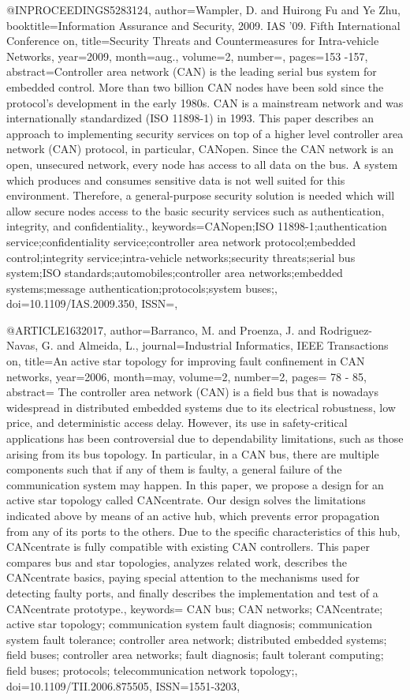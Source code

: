 @INPROCEEDINGS{5283124, 
author={Wampler, D. and Huirong Fu and Ye Zhu}, 
booktitle={Information Assurance and Security, 2009. IAS '09. Fifth International Conference on}, title={Security Threats and Countermeasures for Intra-vehicle Networks}, 
year={2009}, 
month={aug.}, 
volume={2}, 
number={}, 
pages={153 -157}, 
abstract={Controller area network (CAN) is the leading serial bus system for embedded control. More than two billion CAN nodes have been sold since the protocol's development in the early 1980s. CAN is a mainstream network and was internationally standardized (ISO 11898-1) in 1993. This paper describes an approach to implementing security services on top of a higher level controller area network (CAN) protocol, in particular, CANopen. Since the CAN network is an open, unsecured network, every node has access to all data on the bus. A system which produces and consumes sensitive data is not well suited for this environment. Therefore, a general-purpose security solution is needed which will allow secure nodes access to the basic security services such as authentication, integrity, and confidentiality.}, 
keywords={CANopen;ISO 11898-1;authentication service;confidentiality service;controller area network protocol;embedded control;integrity service;intra-vehicle networks;security threats;serial bus system;ISO standards;automobiles;controller area networks;embedded systems;message authentication;protocols;system buses;}, 
doi={10.1109/IAS.2009.350}, 
ISSN={},}

@ARTICLE{1632017, 
author={Barranco, M. and Proenza, J. and Rodriguez-Navas, G. and Almeida, L.}, 
journal={Industrial Informatics, IEEE Transactions on}, title={An active star topology for improving fault confinement in CAN networks}, 
year={2006}, 
month={may}, 
volume={2}, 
number={2}, 
pages={ 78 - 85}, 
abstract={ The controller area network (CAN) is a field bus that is nowadays widespread in distributed embedded systems due to its electrical robustness, low price, and deterministic access delay. However, its use in safety-critical applications has been controversial due to dependability limitations, such as those arising from its bus topology. In particular, in a CAN bus, there are multiple components such that if any of them is faulty, a general failure of the communication system may happen. In this paper, we propose a design for an active star topology called CANcentrate. Our design solves the limitations indicated above by means of an active hub, which prevents error propagation from any of its ports to the others. Due to the specific characteristics of this hub, CANcentrate is fully compatible with existing CAN controllers. This paper compares bus and star topologies, analyzes related work, describes the CANcentrate basics, paying special attention to the mechanisms used for detecting faulty ports, and finally describes the implementation and test of a CANcentrate prototype.}, 
keywords={ CAN bus; CAN networks; CANcentrate; active star topology; communication system fault diagnosis; communication system fault tolerance; controller area network; distributed embedded systems; field buses; controller area networks; fault diagnosis; fault tolerant computing; field buses; protocols; telecommunication network topology;}, 
doi={10.1109/TII.2006.875505}, 
ISSN={1551-3203},}
